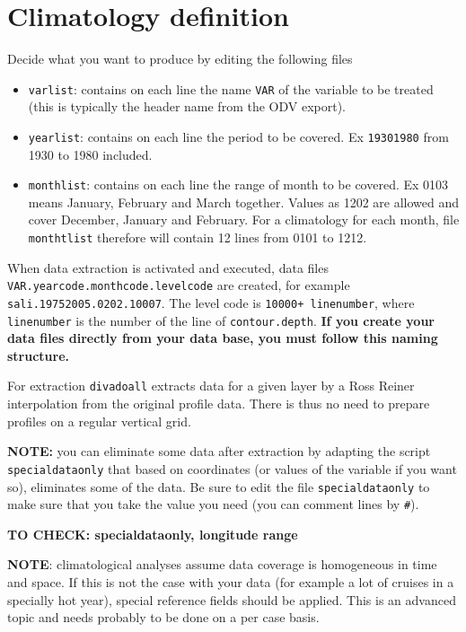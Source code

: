 \documentclass[8pt,a4paper,notitlepage]{book}
\begin{document}
\section{Climatology definition}

Decide what you want to produce by editing the following files
\begin{itemize}
\item {\tt varlist}: contains on each line the name {\tt VAR} of the variable to be treated (this is typically the header name from the ODV export).
\item {\tt yearlist}: contains on each line the period to be covered. Ex {\tt 19301980} from 1930 to 1980 included. 
\item {\tt monthlist}: contains on each line the range of month to be covered. Ex 0103 means January,  February and March together. Values as 1202 are allowed and cover December, January and February. For a climatology for each month, file {\tt monthtlist} therefore will contain 12 lines from 0101 to 1212.
\end{itemize}


When data extraction is activated and executed, data files  {\tt VAR.yearcode.monthcode.levelcode} are created, for example {\tt sali.19752005.0202.10007}. The level code is {\tt 10000+ linenumber}, where {\tt linenumber} is the number of the line of {\tt contour.depth}.
{\bf If you create your data files directly from your data base, you must follow this naming structure.}


For extraction {\tt divadoall} extracts data for a given layer by a Ross Reiner interpolation from the original profile data. There is thus no need to prepare profiles on a regular vertical grid.



{\bf NOTE:} you can eliminate some data after extraction by adapting the script {\tt specialdataonly} that based on coordinates (or values of the variable if you want so), eliminates some of the data. Be sure to edit the file {\tt specialdataonly} to make sure that you take the value you need (you can comment lines by {\tt \#}). 

{\bf TO CHECK: specialdataonly, longitude range}



{\bf NOTE}: climatological analyses assume data coverage is homogeneous in time and space. If this is not the case with your data (for example a lot of cruises in a specially hot year), special reference fields should be applied. This is an advanced topic and needs probably to be done on a per case basis.
\end{document}
